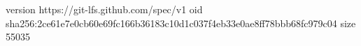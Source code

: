 version https://git-lfs.github.com/spec/v1
oid sha256:2ce61e7e0cb60e69fc166b36183c10d1c037f4eb33e0ae8ff78bbb68fc979c04
size 55035
